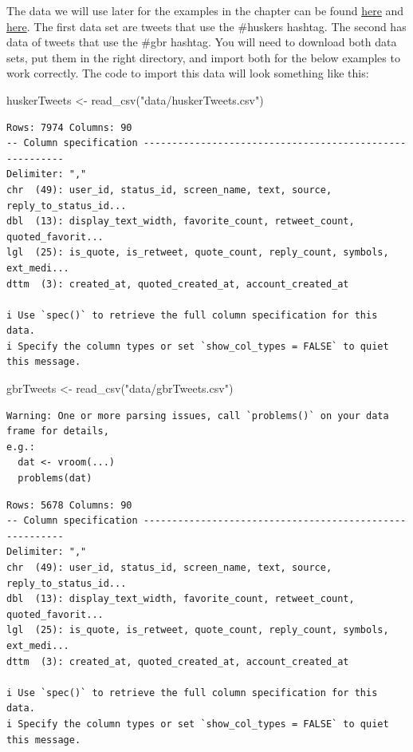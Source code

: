 \documentclass[
  letterpaper,
  DIV=11,
  numbers=noendperiod]{scrreprt}
\newenvironment{Shaded}{\begin{snugshade}}{\end{snugshade}}
\newcommand{\FunctionTok}[1]{\textcolor[rgb]{0.28,0.35,0.67}{#1}}
\newcommand{\NormalTok}[1]{\textcolor[rgb]{0.00,0.23,0.31}{#1}}
\newcommand{\OtherTok}[1]{\textcolor[rgb]{0.00,0.23,0.31}{#1}}
\newcommand{\StringTok}[1]{\textcolor[rgb]{0.13,0.47,0.30}{#1}}
\begin{document}
The data we will use later for the examples in the chapter can be found
\href{https://unl.box.com/s/x4jjifc394gxfvsvbwb3csez2ne4l4rb}{here} and
\href{https://unl.box.com/s/s4ej8khwi9ah9qvqpi2jviqomfocie3n}{here}. The
first data set are tweets that use the \#huskers hashtag. The second has
data of tweets that use the \#gbr hashtag. You will need to download
both data sets, put them in the right directory, and import both for the
below examples to work correctly. The code to import this data will look
something like this:

\begin{Shaded}
\begin{Highlighting}[]
\NormalTok{huskerTweets }\OtherTok{\textless{}{-}} \FunctionTok{read\_csv}\NormalTok{(}\StringTok{"data/huskerTweets.csv"}\NormalTok{)}
\end{Highlighting}
\end{Shaded}

\begin{verbatim}
Rows: 7974 Columns: 90
-- Column specification --------------------------------------------------------
Delimiter: ","
chr  (49): user_id, status_id, screen_name, text, source, reply_to_status_id...
dbl  (13): display_text_width, favorite_count, retweet_count, quoted_favorit...
lgl  (25): is_quote, is_retweet, quote_count, reply_count, symbols, ext_medi...
dttm  (3): created_at, quoted_created_at, account_created_at

i Use `spec()` to retrieve the full column specification for this data.
i Specify the column types or set `show_col_types = FALSE` to quiet this message.
\end{verbatim}

\begin{Shaded}
\begin{Highlighting}[]
\NormalTok{gbrTweets }\OtherTok{\textless{}{-}} \FunctionTok{read\_csv}\NormalTok{(}\StringTok{"data/gbrTweets.csv"}\NormalTok{)}
\end{Highlighting}
\end{Shaded}

\begin{verbatim}
Warning: One or more parsing issues, call `problems()` on your data frame for details,
e.g.:
  dat <- vroom(...)
  problems(dat)
\end{verbatim}

\begin{verbatim}
Rows: 5678 Columns: 90
-- Column specification --------------------------------------------------------
Delimiter: ","
chr  (49): user_id, status_id, screen_name, text, source, reply_to_status_id...
dbl  (13): display_text_width, favorite_count, retweet_count, quoted_favorit...
lgl  (25): is_quote, is_retweet, quote_count, reply_count, symbols, ext_medi...
dttm  (3): created_at, quoted_created_at, account_created_at

i Use `spec()` to retrieve the full column specification for this data.
i Specify the column types or set `show_col_types = FALSE` to quiet this message.
\end{verbatim}
\end{document}
